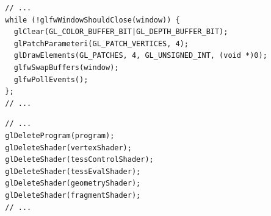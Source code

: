 \documentclass[calcdimensions,landscape,letterpaper]{powersem}
\newcommand{\thecurrentheading}{}
\newcommand{\heading}[1]{\renewcommand{\thecurrentheading}{#1}}
\begin{document}
\begin{slide}
    \heading{Tessellation: Render Patches}
    \begin{center}
        \begin{minipage}[c]{.95\textwidth}
            \begin{verbatim}
  // ...
  while (!glfwWindowShouldClose(window)) {
    glClear(GL_COLOR_BUFFER_BIT|GL_DEPTH_BUFFER_BIT);
    glPatchParameteri(GL_PATCH_VERTICES, 4);
    glDrawElements(GL_PATCHES, 4, GL_UNSIGNED_INT, (void *)0);
    glfwSwapBuffers(window);
    glfwPollEvents();
  };
  // ...
            \end{verbatim}
        \end{minipage}
    \end{center}
\end{slide}

\begin{slide}
    \heading{Tessellation: Cleanup}
    \begin{center}
        \begin{minipage}[c]{.7\textwidth}
            \begin{verbatim}
  // ...
  glDeleteProgram(program);
  glDeleteShader(vertexShader);
  glDeleteShader(tessControlShader);
  glDeleteShader(tessEvalShader);
  glDeleteShader(geometryShader);
  glDeleteShader(fragmentShader);
  // ...
            \end{verbatim}
        \end{minipage}
    \end{center}
\end{slide}

\begin{slide}
    \heading{Tessellation: Result}
    \begin{center}
    \end{center}
\end{slide}
\end{document}
